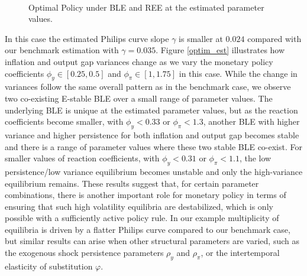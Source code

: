  \begin{figure}
\centering        
             \mbox{} 
 \mbox{} \\  
            \caption{Optimal Policy under BLE and REE at the estimated parameter values.}
            \label{mult_eqm}
\end{figure}  

In this case the estimated Philips curve slope $\gamma$ is smaller at $0.024$ compared with our benchmark estimation with $\gamma=0.035$. Figure \ref{optim_est} illustrates how inflation and output gap variances change as we vary the monetary policy coefficients $\phi_y \in [0.25, 0.5]$ and $\phi_{\pi} \in [1,1.75]$ in this case. While the change in variances follow the same overall pattern as in the benchmark case, we observe two co-existing E-stable BLE over a small range of parameter values. The underlying BLE is unique at the estimated parameter values, but as the reaction coefficients become smaller, with $\phi_y<0.33$ or $\phi_{\pi}<1.3$, another BLE with higher variance and higher persistence for both inflation and output gap becomes stable and there is a range of parameter values where these two stable BLE co-exist. For smaller values of reaction coefficients,
with $\phi_y < 0.31$ or $\phi_{\pi}<1.1$, 
the low persistence/low variance equilibrium becomes unstable and only the high-variance equilibrium remains. These results suggest that, for certain parameter combinations, there is another important role for monetary policy in terms of ensuring that such high volatility equilibria are destabilized, which is only possible with a sufficiently active policy rule. In our example multiplicity of equilibria is driven by a flatter Philips curve compared to our benchmark case, but similar results can arise when other structural parameters are varied, such as the exogenous shock persistence parameters $\rho_y$ and $\rho_{\pi}$, or the intertemporal elasticity of substitution $\varphi$. \\



